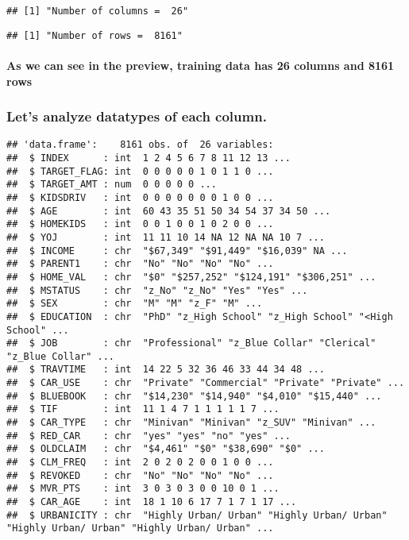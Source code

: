 \documentclass[]{article}
\let\oldparagraph\paragraph
\renewcommand{\paragraph}[1]{\oldparagraph{#1}\mbox{}}
\begin{document}
\begin{verbatim}
## [1] "Number of columns =  26"
\end{verbatim}

\begin{verbatim}
## [1] "Number of rows =  8161"
\end{verbatim}

\hypertarget{as-we-can-see-in-the-preview-training-data-has-26-columns-and-8161-rows}{%
\paragraph{As we can see in the preview, training data has 26 columns
and 8161
rows}\label{as-we-can-see-in-the-preview-training-data-has-26-columns-and-8161-rows}}

\hypertarget{lets-analyze-datatypes-of-each-column.}{%
\subsubsection{\texorpdfstring{\textbf{Let's analyze datatypes of each
column.}}{Let's analyze datatypes of each column.}}\label{lets-analyze-datatypes-of-each-column.}}

\begin{verbatim}
## 'data.frame':    8161 obs. of  26 variables:
##  $ INDEX      : int  1 2 4 5 6 7 8 11 12 13 ...
##  $ TARGET_FLAG: int  0 0 0 0 0 1 0 1 1 0 ...
##  $ TARGET_AMT : num  0 0 0 0 0 ...
##  $ KIDSDRIV   : int  0 0 0 0 0 0 0 1 0 0 ...
##  $ AGE        : int  60 43 35 51 50 34 54 37 34 50 ...
##  $ HOMEKIDS   : int  0 0 1 0 0 1 0 2 0 0 ...
##  $ YOJ        : int  11 11 10 14 NA 12 NA NA 10 7 ...
##  $ INCOME     : chr  "$67,349" "$91,449" "$16,039" NA ...
##  $ PARENT1    : chr  "No" "No" "No" "No" ...
##  $ HOME_VAL   : chr  "$0" "$257,252" "$124,191" "$306,251" ...
##  $ MSTATUS    : chr  "z_No" "z_No" "Yes" "Yes" ...
##  $ SEX        : chr  "M" "M" "z_F" "M" ...
##  $ EDUCATION  : chr  "PhD" "z_High School" "z_High School" "<High School" ...
##  $ JOB        : chr  "Professional" "z_Blue Collar" "Clerical" "z_Blue Collar" ...
##  $ TRAVTIME   : int  14 22 5 32 36 46 33 44 34 48 ...
##  $ CAR_USE    : chr  "Private" "Commercial" "Private" "Private" ...
##  $ BLUEBOOK   : chr  "$14,230" "$14,940" "$4,010" "$15,440" ...
##  $ TIF        : int  11 1 4 7 1 1 1 1 1 7 ...
##  $ CAR_TYPE   : chr  "Minivan" "Minivan" "z_SUV" "Minivan" ...
##  $ RED_CAR    : chr  "yes" "yes" "no" "yes" ...
##  $ OLDCLAIM   : chr  "$4,461" "$0" "$38,690" "$0" ...
##  $ CLM_FREQ   : int  2 0 2 0 2 0 0 1 0 0 ...
##  $ REVOKED    : chr  "No" "No" "No" "No" ...
##  $ MVR_PTS    : int  3 0 3 0 3 0 0 10 0 1 ...
##  $ CAR_AGE    : int  18 1 10 6 17 7 1 7 1 17 ...
##  $ URBANICITY : chr  "Highly Urban/ Urban" "Highly Urban/ Urban" "Highly Urban/ Urban" "Highly Urban/ Urban" ...
\end{verbatim}
\end{document}
